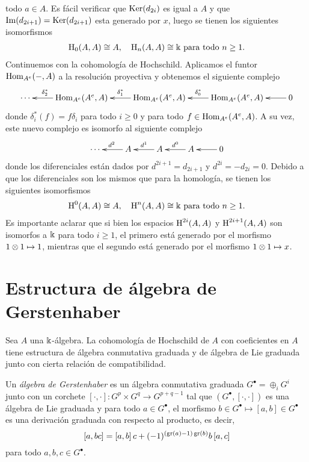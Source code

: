\documentclass[a4paper,oneside,fleqn,11pt,../tesis.tex]{subfiles}
\begin{document}
\begin{example}
	todo $a \in A$. Es fácil verificar que $\operatorname{Ker}(d_{2i})$ es igual a $A$ y que $\operatorname{Im}(d_{2i + 1}) = \operatorname{Ker}(d_{2i + 1})$ esta generado por $x$, luego
	se tienen los siguientes isomorfismos
	\begin{align*}
		\operatorname{H}_0(A,A) \cong A, \quad \operatorname{H}_n(A,A) \cong \Bbbk \text{ para todo } n \geq 1.
	\end{align*}	
	Continuemos con la cohomología de Hochschild. Aplicamos el funtor $\operatorname{Hom}_{A^e}(-,A)$ a la resolución proyectiva y obtenemos 
	el siguiente complejo
	\begin{align*}
		\xymatrix{
		\cdots & \Hom_{A^e}(A^e,A) \ar[l]_(.65){\delta_2^{\ast}} & \Hom_{A^e}(A^e,A) \ar[l]_{\delta_1^{\ast}}
			& \Hom_{A^e}(A^e,A) \ar[l]_{\delta_0^{\ast}} & 0 \ar[l],
		}
	\end{align*}	
	donde $\delta_i^{\ast}(f) = f \delta_i$ para todo $i \geq 0$ y para todo $f \in \operatorname{Hom}_{A^e}(A^e,A)$. A su vez, este nuevo
	complejo es isomorfo al siguiente complejo
	\begin{align*}
		\xymatrix{
		\cdots & A \ar[l]_{d^2} & A \ar[l]_{d^1}
			& A \ar[l]_{d^0} & 0 \ar[l],
		}
	\end{align*}	
	donde los diferenciales están dados por $d^{2i + 1} = d_{2i + 1}$ y $d^{2i} = -d_{2i} = 0$. Debido a que los diferenciales
	son los mismos que para la homología, se tienen los siguientes isomorfismos
	\begin{align*}
		\operatorname{H}^0(A,A) \cong A, \quad \operatorname{H}^n(A,A) \cong \Bbbk \text{ para todo } n \geq 1.
	\end{align*}	
	Es importante aclarar que si bien los espacios $\operatorname{H}^{2i}(A,A)$ y $\operatorname{H}^{2i + 1}(A,A)$ son isomorfos a $\Bbbk$ para todo $i \geq 1$,
	el primero está generado por el morfismo $1 \otimes 1 \mapsto 1$, mientras que el segundo está generado por el morfismo $1\otimes 1 \mapsto x$.
\end{example}

\section{Estructura de álgebra de Gerstenhaber}\label{hochschild_gerstenhaber}

Sea $A$ una $\Bbbk$-álgebra. La cohomología de Hochschild de $A$ con coeficientes en $A$ tiene estructura
de álgebra conmutativa graduada y de álgebra de Lie graduada junto con cierta relación de compatibilidad.

\begin{definition}
	Un \emph{álgebra de Gerstenhaber} es un álgebra conmutativa graduada $G^{\bullet} = \oplus_{i}G^i$ junto con
	un corchete $\left[\cdot, \cdot \right]: G^{p} \times G^{q} \to G^{p + q - 1}$
	tal que $\left(G^{\bullet}, \left[\cdot, \cdot \right]\right)$ es una álgebra de Lie graduada y para todo $a \in G^{\bullet}$,
	el morfismo $b \in G^{\bullet} \mapsto \left[a,b\right] \in G^{\bullet}$
	es una derivación graduada con respecto al producto, es decir,
	\[
		\left[a, b c\right] = \left[a,b\right]c + (-1)^{(\operatorname{gr}(a) - 1)\operatorname{gr}(b)}b\left[a, c\right]
	\]
	para todo $a, b, c \in G^{\bullet}$.
\end{definition}
\end{document}
